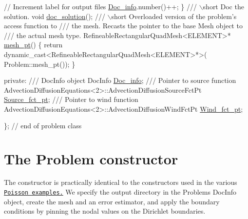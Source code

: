 \begin{DoxyCodeInclude}
   \textcolor{comment}{// Increment label for output files}
   \hyperlink{classRefineableAdvectionDiffusionProblem_a42bd65f40095a70a103ee900e7614b19}{Doc\_info}.number()++;
  \}
\textcolor{comment}{}
\textcolor{comment}{ /// \(\backslash\)short Doc the solution.}
\textcolor{comment}{} \textcolor{keywordtype}{void} \hyperlink{classRefineableAdvectionDiffusionProblem_a735d7fdd587d4730ffe1113b11ca3b56}{doc\_solution}();
\textcolor{comment}{}
\textcolor{comment}{ /// \(\backslash\)short Overloaded version of the problem's access function to }
\textcolor{comment}{ /// the mesh. Recasts the pointer to the base Mesh object to }
\textcolor{comment}{ /// the actual mesh type.}
\textcolor{comment}{} RefineableRectangularQuadMesh<ELEMENT>* \hyperlink{classRefineableAdvectionDiffusionProblem_abe616b5b3d3e4d3c0d3be777e3b3ac34}{mesh\_pt}() 
  \{
   \textcolor{keywordflow}{return} \textcolor{keyword}{dynamic\_cast<}RefineableRectangularQuadMesh<ELEMENT>*\textcolor{keyword}{>}(
    Problem::mesh\_pt());
  \}

\textcolor{keyword}{private}:
\textcolor{comment}{}
\textcolor{comment}{ /// DocInfo object}
\textcolor{comment}{} DocInfo \hyperlink{classRefineableAdvectionDiffusionProblem_a42bd65f40095a70a103ee900e7614b19}{Doc\_info};
\textcolor{comment}{}
\textcolor{comment}{ /// Pointer to source function}
\textcolor{comment}{} AdvectionDiffusionEquations<2>::AdvectionDiffusionSourceFctPt \hyperlink{classRefineableAdvectionDiffusionProblem_a8fa313562d365965e24282c2e11a8ec6}{Source\_fct\_pt};
\textcolor{comment}{}
\textcolor{comment}{ /// Pointer to wind function}
\textcolor{comment}{} AdvectionDiffusionEquations<2>::AdvectionDiffusionWindFctPt \hyperlink{classRefineableAdvectionDiffusionProblem_ab52483c93bacbb9521aaaf52680be996}{Wind\_fct\_pt};

\}; \textcolor{comment}{// end of problem class}

\end{DoxyCodeInclude}




 

\hypertarget{index_constructor}{}\section{The Problem constructor}\label{index_constructor}
The constructor is practically identical to the constructors used in the various \href{../../../poisson/two_d_poisson/html/index.html#constructor}{\tt Poisson examples.} We specify the output directory in the {\ttfamily Problem\textquotesingle{}s} {\ttfamily Doc\+Info} object, create the mesh and an error estimator, and apply the boundary conditions by pinning the nodal values on the Dirichlet boundaries.


